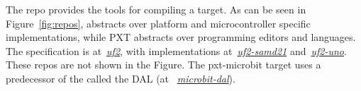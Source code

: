 The repo \emph{\href{https://github.com/lancaster-university/codal}{\COLN}} provides the
tools for compiling a \CO target.  As can be seen in Figure~\ref{fig:repos},
\CO abstracts over platform and microcontroller specific
implementations, while PXT abstracts over programming editors and languages.
The \UF specification is at~\emph{\href{https://github.com/microsoft/uf2}{uf2}},
with implementations at~\emph{\href{https://github.com/microsoft/uf2-samd21}{uf2-samd21}}
and~\emph{\href{https://github.com/mmoskal/uf2-uno}{uf2-uno}}. These repos are not
shown in the Figure.
The pxt-microbit target uses a predecessor of the \CO called the DAL (at
~\emph{\href{https://github.com/lancaster-university/microbit-dal}{microbit-dal}}).
